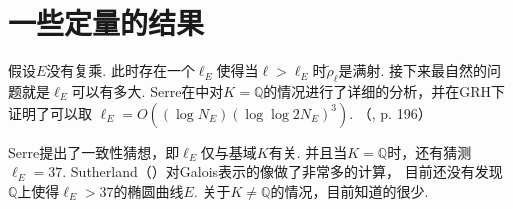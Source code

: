 \chapter{一些定量的结果}

假设$E$没有复乘. 此时存在一个$\ell_E$使得当$\ell>\ell_E$时$\tilde{\rho}_{\ell}$是满射.
接下来最自然的问题就是$\ell_{E}$可以有多大.
Serre在\parencite{serre1981quelques}中对$K=\mathbb{Q}$的情况进行了详细的分析，并在GRH下证明了可以取
$\ell_E = O((\log N_E) (\log\log 2N_E)^3)$. （\parencite{serre1981quelques}, p. 196）

Serre提出了一致性猜想，即$\ell_{E}$仅与基域$K$有关. 并且当$K = \mathbb{Q}$时，还有猜测$\ell_{E} = 37$.
Sutherland（\parencite{sutherland}）对Galois表示的像做了非常多的计算，
目前还没有发现$\mathbb{Q}$上使得$\ell_{E}>37$的椭圆曲线$E$.
关于$K\neq \mathbb{Q}$的情况，目前知道的很少.



